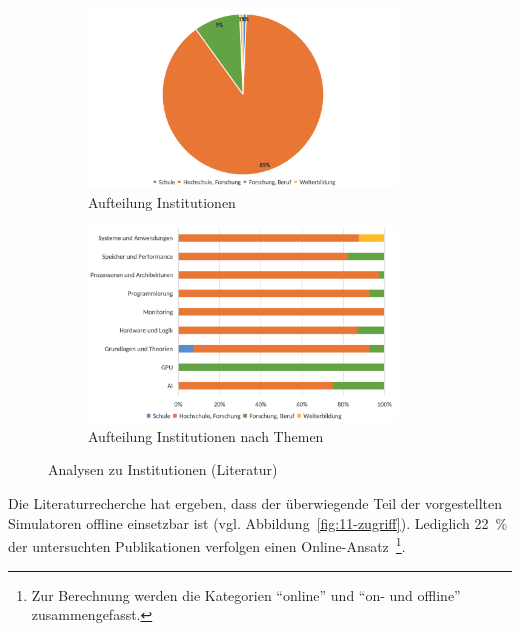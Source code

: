 \begin{figure}[!htbp]
    \centering
    \begin{subfigure}[b]{0.48\textwidth}
        \centering
        \includegraphics[width=0.90\textwidth]{graphics_lit/9-institution.png}
        \caption{Aufteilung Institutionen}
        \label{fig:9-institution}
    \end{subfigure}
    \hfill
    \begin{subfigure}[b]{0.48\textwidth}
        \centering
        \includegraphics[width=0.90\textwidth]{graphics_lit/10-institution-themen.png}
        \caption{Aufteilung Institutionen nach Themen}
        \label{fig:10-institution-themen}
    \end{subfigure}
    \caption{Analysen zu Institutionen (Literatur)}
    \label{fig:institution-analysen}
\end{figure}

Die Literaturrecherche hat ergeben, dass der überwiegende Teil der vorgestellten Simulatoren offline einsetzbar ist (vgl. Abbildung~\ref{fig:11-zugriff}). Lediglich 22~\% der untersuchten Publikationen verfolgen einen Online-Ansatz~\footnote{Zur Berechnung werden die Kategorien \enquote{online} und \enquote{on- und offline} zusammengefasst.}.

